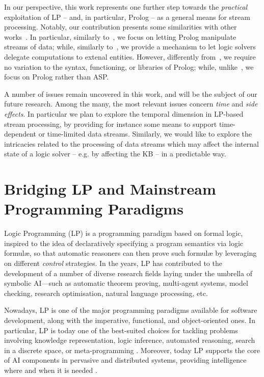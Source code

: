 \documentclass[12pt,a4paper,openright,twoside]{book}
\begin{document}
In our perspective, this work represents one further step towards the \emph{practical} exploitation of LP -- and, in particular, Prolog -- as a general means for stream processing.
%
Notably, our contribution presents some similarities with other works~\cite{Tarau2019,Redl16}.
%
In particular, similarly to~\cite{Tarau2019}, we focus on letting Prolog manipulate streams of data; while, similarly to~\cite{Redl16}, we provide a mechanism to let logic solvers delegate computations to extenal entities.
%
However, differently from~\cite{Tarau2019}, we require no variation to the syntax, functioning, or libraries of Prolog; while, unlike~\cite{Redl16}, we focus on Prolog rather than ASP.

A number of issues remain uncovered in this work, and will be the subject of our future research.
%
Among the many, the most relevant issues concern \emph{time} and \emph{side effects}.
%
In particular we plan to explore the temporal dimension in LP-based stream processing, by providing for instance some means to support time-dependent or time-limited data streams.
%
Similarly, we would like to explore the intricacies related to the processing of data streams which may affect the internal state of a logic solver -- e.g. by affecting the KB -- in a predictable way.

\chapter{Bridging LP and Mainstream Programming Paradigms}


Logic Programming (LP) \cite{Apt2001,Kowalski1974} is a programming pa\-ra\-di\-gm based on formal logic, inspired to the idea of declaratively specifying a program semantics via logic formul\ae{}, so that automatic reasoners can then prove such formul\ae{} by leveraging on different \emph{control} strategies.
%
In the years, LP has contributed to the development of a number of diverse research fields laying under the umbrella of symbolic AI---such as automatic theorem proving, multi-agent systems, model checking, research optimisation, natural language processing, etc.

Nowadays, LP is one of the major programming pa\-ra\-di\-gms available for software development, along with the imperative, functional, and object-oriented ones.
%
In particular, LP is today one of the best-suited choices for tackling problems involving knowledge representation, logic inference, automated reasoning, search in a discrete space, or meta-programming \cite{logictech-information11}.
%
Moreover, today LP supports the core of AI components in pervasive and distributed systems, providing intelligence where and when it is needed \cite{microintelligencelp-mmasII}.
\end{document}
